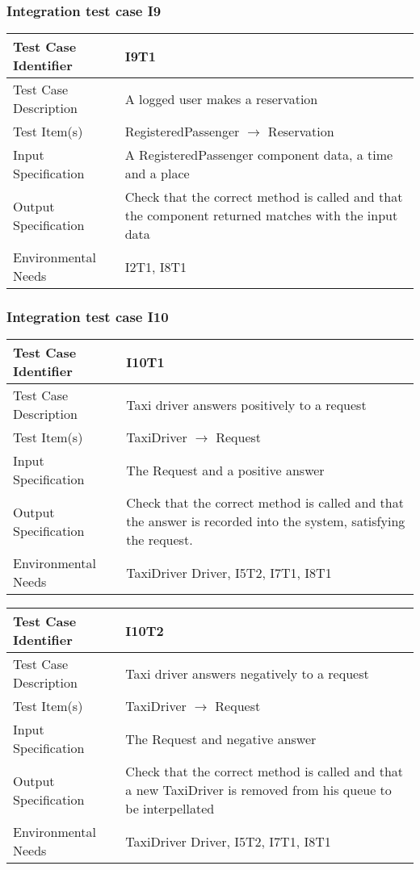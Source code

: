 		\subsubsection{Integration test case I9}
		\begin{center}
			\begin{tabular}{ |l p{10cm}| } \hline
				Test Case Identifier & I9T1 \\ \hline
				Test Case Description & A logged user makes a reservation \\ \hline
				Test Item(s) & RegisteredPassenger $\rightarrow$ Reservation \\ \hline
				Input Specification & A RegisteredPassenger component data, a time and a place \\ \hline
				Output Specification & Check that the correct method is called and that the component returned matches
				with the input data \\ \hline
				Environmental Needs & I2T1, I8T1 \\ \hline
			\end{tabular}
		\end{center}
		\subsubsection{Integration test case I10}
		\begin{center}
			\begin{tabular}{ |l p{10cm}| } \hline
				Test Case Identifier & I10T1 \\ \hline
				Test Case Description & Taxi driver answers positively to a request \\ \hline
				Test Item(s) & TaxiDriver $\rightarrow$ Request \\ \hline
				Input Specification & The Request and a positive answer \\ \hline
				Output Specification & Check that the correct method is called and that the answer is recorded
				into the system, satisfying the request. \\ \hline
				Environmental Needs & TaxiDriver Driver, I5T2, I7T1, I8T1 \\ \hline
			\end{tabular}
			\vspace{1cm}
			\begin{tabular}{ |l p{10cm}| } \hline
				Test Case Identifier & I10T2 \\ \hline
				Test Case Description & Taxi driver answers negatively to a request \\ \hline
				Test Item(s) & TaxiDriver $\rightarrow$ Request \\ \hline
				Input Specification & The Request and negative answer \\ \hline
				Output Specification & Check that the correct method is called and that a new TaxiDriver is
				removed from his queue to be interpellated \\ \hline
				Environmental Needs & TaxiDriver Driver, I5T2, I7T1, I8T1 \\ \hline
			\end{tabular}
		\end{center}
